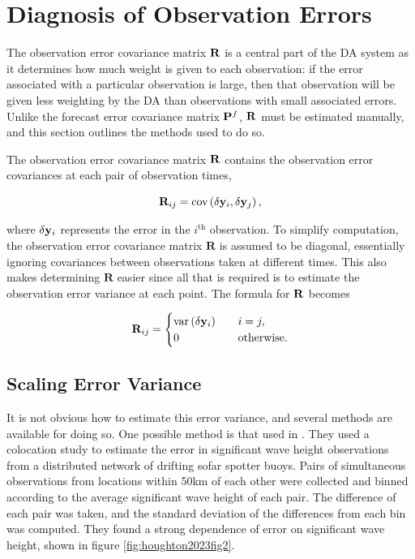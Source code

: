 \section{Diagnosis of Observation Errors}
\label{sec:obserrors}

The observation error covariance matrix $\mathbf{R}$ is a central part of the DA system as it determines how much weight is given to each observation: if the error associated with a particular observation is large, then that observation will be given less weighting by the DA than observations with small associated errors. Unlike the forecast error covariance matrix $\mathbf{P}^f$, $\mathbf{R}$ must be estimated manually, and this section outlines the methods used to do so.

The observation error covariance matrix $\mathbf{R}$ contains the observation error covariances at each pair of observation times,

\[
\mathbf{R}_{ij} = \text{cov}\left( \delta \mathbf{y}_i, \delta \mathbf{y}_j \right),
\]

where $\delta \mathbf{y}_i$ represents the error in the $i^\text{th}$ observation. To simplify computation, the observation error covariance matrix $\mathbf{R}$ is assumed to be diagonal, essentially ignoring covariances between observations taken at different times. This also makes determining $\mathbf{R}$ easier since all that is required is to estimate the observation error variance at each point. The formula for $\mathbf{R}$ becomes

\[
\mathbf{R}_{ij} = \begin{cases}
	\text{var} \left( \delta \mathbf{y}_i \right)  \quad &i = j, \\
	0 &\text{otherwise.}
\end{cases}
\]

\subsection{Scaling Error Variance}
\label{sec:scaleerrs}

It is not obvious how to estimate this error variance, and several methods are available for doing so. One possible method is that used in \citet{Houghton2023}. They used a colocation study to estimate the error in significant wave height observations from a distributed network of drifting sofar spotter buoys. Pairs of simultaneous observations from locations within 50km of each other were collected and binned according to the average significant wave height of each pair. The difference of each pair was taken, and the standard deviation of the differences from each bin was computed. They found a strong dependence of error on significant wave height, shown in figure \ref{fig:houghton2023fig2}.

